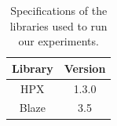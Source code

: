 \vspace{\baselineskip}	
\begin{table}[H]
	\centering
	\scalebox{0.75}
	{\begin{tabular}{|c | c |} 
			\hline
			Library & Version \\
			\hline
			\hline
			HPX & 1.3.0 \\ 
			\hline
			Blaze & 3.5\\ 	
			\hline
			
	\end{tabular}}	
	\caption{Specifications of the libraries used to run our experiments.}
	\label{table5}
\end{table}
%
%
%
%
%
%



